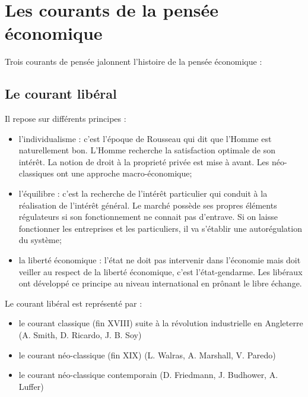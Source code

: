 \documentclass[11pt]{article}
\begin{document}
	\section{Les courants de la pensée économique}
		Trois courants de pensée jalonnent l'histoire de la pensée économique :
		\subsection{Le courant libéral}
			Il repose sur différents principes :
			\begin{itemize}
				\item l'individualisme : c'est l'époque de Rousseau qui dit que l'Homme est naturellement bon. L'Homme recherche la satisfaction optimale de son intérêt. La notion de droit à la proprieté privée est mise à avant. Les néo-classiques ont une approche macro-économique;
				\item l'équilibre : c'est la recherche de l'intérêt particulier qui conduit à la réalisation de l'intérêt général. Le marché possède ses propres éléments régulateurs si son fonctionnement ne connait pas d'entrave. Si on laisse fonctionner les entreprises et les particuliers, il va s'établir une autorégulation du système;
				\item la liberté économique : l'état ne doit pas intervenir dans l'économie mais doit veiller au respect de la liberté économique, c'est l'état-gendarme. Les libéraux ont développé ce principe au niveau international en prônant le libre échange.
			\end{itemize}
			
			Le courant libéral est représenté par :
			\begin{itemize}
				\item le courant classique (fin XVIII) suite à la révolution industrielle en Angleterre (A. Smith, D. Ricardo, J. B. Soy)
				\item le courant néo-classique (fin XIX) (L. Walras, A. Marshall, V. Paredo)
				\item le courant néo-classique contemporain (D. Friedmann, J. Budhower, A. Luffer)
			\end{itemize}
			
\end{document}
